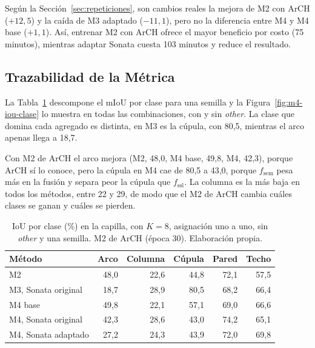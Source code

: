Según la Sección~\ref{sec:repeticiones}, son cambios reales la mejora de M2 con ArCH
($+12{,}5$) y la caída de M3 adaptado ($-11{,}1$), pero no la diferencia entre M4 y
M4 base ($+1{,}1$). Así, entrenar M2 con ArCH ofrece el mayor beneficio por costo
(75 minutos), mientras adaptar Sonata cuesta 103 minutos y reduce el resultado.

\FloatBarrier
\subsection[Trazabilidad de la Métrica]{Trazabilidad de la Métrica}
\label{sec:res-u3-traza}

La Tabla~\ref{tab:iou-clase} descompone el mIoU por clase para una semilla y la
Figura~\ref{fig:m4-iou-clase} lo muestra en todas las combinaciones, con y sin
\emph{other}. La clase que domina cada agregado es distinta, en M3 es la cúpula, con
80{,}5, mientras el arco apenas llega a 18{,}7.

Con M2 de ArCH el arco mejora (M2, 48{,}0, M4 base, 49{,}8, M4, 42{,}3), porque ArCH sí
lo conoce, pero la cúpula en M4 cae de 80{,}5 a 43{,}0, porque $f_{\mathrm{sem}}$ pesa
más en la fusión y separa peor la cúpula que $f_{\mathrm{ssl}}$. La columna es la más
baja en todos los métodos, entre 22 y 29, de modo que el M2 de ArCH cambia cuáles
clases se ganan y cuáles se pierden.

\begin{table}[!htbp]
\centering
\small
\caption[IoU por clase en la capilla]{IoU por clase (\%) en la capilla, con $K=8$, asignación uno a uno, sin \emph{other} y una semilla. M2 de ArCH (época 30). Elaboración propia.}
\label{tab:iou-clase}
\begin{tabularx}{\linewidth}{@{}>{\raggedright\arraybackslash}Xrrrrr@{}}
\toprule
\textbf{Método} & \textbf{Arco} & \textbf{Columna} & \textbf{Cúpula} & \textbf{Pared} & \textbf{Techo} \\
\midrule
M2 & 48,0 & 22,6 & 44,8 & 72,1 & 57,5 \\
M3, Sonata original & 18,7 & 28,9 & 80,5 & 68,2 & 66,4 \\
M4 base & 49,8 & 22,1 & 57,1 & 69,0 & 66,6 \\
M4, Sonata original & 42,3 & 28,6 & 43,0 & 74,2 & 65,1 \\
M4, Sonata adaptado & 27,2 & 24,3 & 43,9 & 72,0 & 69,8 \\
\bottomrule
\end{tabularx}
\end{table}

